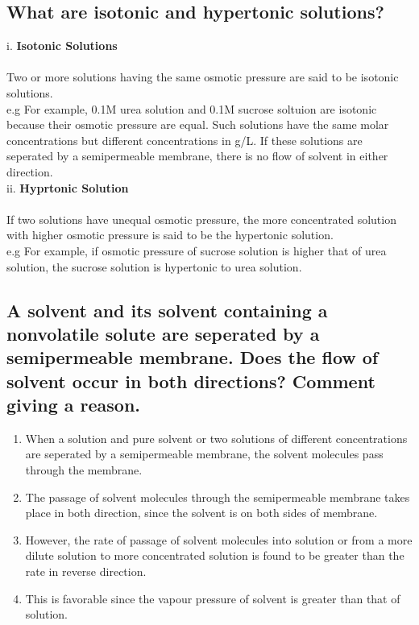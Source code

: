 \documentclass{article}
\begin{document}
   \subsection{What are isotonic and hypertonic solutions?}
   i. \textbf{Isotonic Solutions} \\\\
   Two or more solutions having the same osmotic pressure are said to
   be isotonic solutions.\\
   e.g For example, 0.1M urea solution and 0.1M sucrose soltuion are
   isotonic because their osmotic pressure are equal. Such solutions
   have the same molar concentrations but different concentrations in
   g/L. If these solutions are seperated by a semipermeable membrane,
   there is no flow of solvent in either direction. \\
   ii. \textbf{Hyprtonic Solution} \\\\
   If two solutions have unequal osmotic pressure, the more
   concentrated solution with higher osmotic pressure is said to be
   the hypertonic solution.\\
   e.g For example, if osmotic pressure of sucrose solution is higher
   that of urea solution, the sucrose solution is hypertonic to urea
   solution.

   \subsection{A solvent and its solvent containing a nonvolatile
   solute are seperated by a semipermeable membrane. Does the flow of
   solvent occur in both directions? Comment giving a reason.}
   \begin{enumerate}
	\item When a solution and pure solvent or two solutions of
	different concentrations are seperated by a semipermeable
	membrane, the solvent molecules pass through the membrane.
	\item The passage of solvent molecules through the 
	semipermeable membrane takes place in both direction, since
	the solvent is on both sides of membrane.
	\item However, the rate of passage of solvent molecules into
	solution or from a more dilute solution to more concentrated
	solution is found to be greater than the rate in reverse 
	direction.
	\item This is favorable since the vapour pressure of solvent
	is greater than that of solution.
   \end{enumerate}
\end{document}
